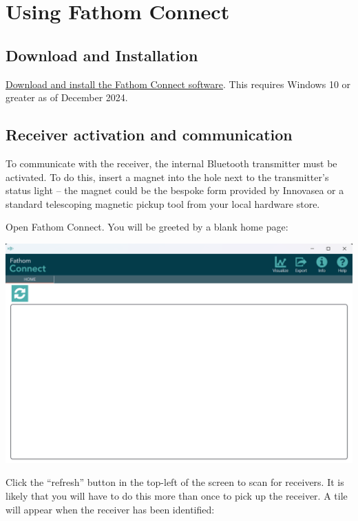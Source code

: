 \documentclass[
  letterpaper,
  DIV=11,
  numbers=noendperiod]{scrreprt}
\begin{document}
\chapter{Using Fathom Connect}\label{using-fathom-connect}

\section{Download and Installation}\label{download-and-installation}

\href{https://go.innovasea.com/l/857523/2020-03-17/52d9?Redirect=https://innovasea.my.salesforce.com/sfc/p/41000000flbW/a/OO000000M7cL/BQ3ZOlAidUVjrBh8rOzNkz6IJEPwDHUuXQ8EHkXYDdQ}{Download
and install the Fathom Connect software}. This requires Windows 10 or
greater as of December 2024.

\section{Receiver activation and
communication}\label{receiver-activation-and-communication}

To communicate with the receiver, the internal Bluetooth transmitter
must be activated. To do this, insert a magnet into the hole next to the
transmitter's status light -- the magnet could be the bespoke form
provided by Innovasea or a standard telescoping magnetic pickup tool
from your local hardware store.

Open Fathom Connect. You will be greeted by a blank home page:

\includegraphics{images/fathom/home.png}

Click the ``refresh'' button in the top-left of the screen to scan for
receivers. It is likely that you will have to do this more than once to
pick up the receiver. A tile will appear when the receiver has been
identified:
\end{document}
